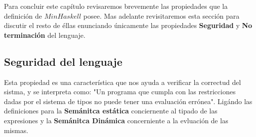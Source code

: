     Para concluir este capítulo revisaremos brevemente las propiedades que la definición de $MinHaskell$ posee. Mas adelante revisitaremos esta sección para discutir el resto de éllas enunciando únicamente las propiedades \textbf{Seguridad} y \textbf{No terminación} del lenguaje.

    \subsection{Seguridad del lenguaje}
        Esta propiedad es una característica que nos ayuda a verificar la correctud del sistma, y se interpreta como: "Un programa que cumpla con las restricciones dadas por el sistema de tipos no puede tener una evaluación errónea". Ligándo las definiciones para la \textbf{Semánitca estática} conciernente al tipado de las expresiones y la \textbf{Semánitca Dinámica} concerniente a la evluación de las mismas.\\
        
